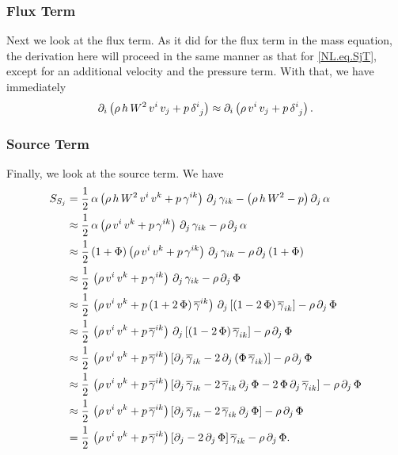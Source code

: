 \subsubsection{Flux Term}
Next we look at the flux term.
As it did for the flux term in the mass equation,
the derivation here will proceed in the same manner as that
for \eqref{NL.eq.SjT},
except for an additional velocity and the pressure term.
With that, we have immediately
\begin{equation}
  \partial_{i}\left(\rho\,h\,W^{2}\,v^{i}\,v_{j}+p\,\delta^{i}_{~j}\right)
  \approx\partial_{i}\left(\rho\,v^{i}\,v_{j}+p\,\delta^{i}_{~j}\right).
\end{equation}

\subsubsection{Source Term}
Finally, we look at the source term.
We have
\begin{align}
  S_{S_{j}}
  &=\frac{1}{2}\,\alpha
  \left(\rho\,h\,W^{2}\,v^{i}\,v^{k}+p\,\gamma^{ik}\right)\,
  \partial_{j}\,\gamma_{ik}-\left(\rho\,h\,W^{2}-p\right)\partial_{j}\,\alpha \\
  &\approx\frac{1}{2}\,\alpha
  \left(\rho\,v^{i}\,v^{k}+p\,\gamma^{ik}\right)\,
  \partial_{j}\,\gamma_{ik}-\rho\,\partial_{j}\,\alpha \\
  &\approx\frac{1}{2}\left(1+\Phi\right)
  \left(\rho\,v^{i}\,v^{k}+p\,\gamma^{ik}\right)\,
  \partial_{j}\,\gamma_{ik}-\rho\,\partial_{j}\left(1+\Phi\right) \\
  &\approx\frac{1}{2}\,
  \left(\rho\,v^{i}\,v^{k}+p\,\gamma^{ik}\right)\,
  \partial_{j}\,\gamma_{ik}-\rho\,\partial_{j}\,\Phi \\
  &\approx\frac{1}{2}\,
  \left(\rho\,v^{i}\,v^{k}
  +p\left(1+2\,\Phi\right)\overline{\gamma}^{ik}\right)\,
  \partial_{j}\left[\left(1-2\,\Phi\right)\overline{\gamma}_{ik}\right]
  -\rho\,\partial_{j}\,\Phi \\
  &\approx\frac{1}{2}\,
  \left(\rho\,v^{i}\,v^{k}
  +p\,\overline{\gamma}^{ik}\right)\,
  \partial_{j}\left[\left(1-2\,\Phi\right)\overline{\gamma}_{ik}\right]
  -\rho\,\partial_{j}\,\Phi \\
  &\approx\frac{1}{2}\,
  \left(\rho\,v^{i}\,v^{k}
  +p\,\overline{\gamma}^{ik}\right)
  \left[\partial_{j}\,\overline{\gamma}_{ik}
  -2\,\partial_{j}\left(\Phi\,\overline{\gamma}_{ik}\right)\right]
  -\rho\,\partial_{j}\,\Phi \\
  &\approx\frac{1}{2}\,
  \left(\rho\,v^{i}\,v^{k}
  +p\,\overline{\gamma}^{ik}\right)
  \left[\partial_{j}\,\overline{\gamma}_{ik}
  -2\,\overline{\gamma}_{ik}\,\partial_{j}\,\Phi
  -2\,\Phi\,\partial_{j}\,\overline{\gamma}_{ik}\right]
  -\rho\,\partial_{j}\,\Phi \\
  &\approx\frac{1}{2}\,
  \left(\rho\,v^{i}\,v^{k}
  +p\,\overline{\gamma}^{ik}\right)
  \left[\partial_{j}\,\overline{\gamma}_{ik}
  -2\,\overline{\gamma}_{ik}\,\partial_{j}\,\Phi\right]
  -\rho\,\partial_{j}\,\Phi \\
  &=\frac{1}{2}\,
  \left(\rho\,v^{i}\,v^{k}
  +p\,\overline{\gamma}^{ik}\right)
  \left[\partial_{j}-2\,\partial_{j}\,\Phi\right]\overline{\gamma}_{ik}
  -\rho\,\partial_{j}\,\Phi.
\end{align}
